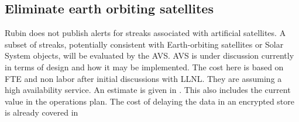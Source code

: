 
\subsection{Eliminate earth orbiting satellites} \label{sec:4eliminate}

Rubin does not publish alerts for streaks associated with artificial satellites.
A subset of streaks, potentially consistent with Earth-orbiting satellites or Solar System objects, will be evaluated by the AVS.
AVS is under discussion currently in terms of design and how it may be implemented.
The cost here is based on FTE  and non labor after initial discussions with LLNL.
They are assuming a high availability service.
An estimate is given in . This also includes the current value in the operations plan.
The cost of delaying the data in an encrypted store is already covered in 




